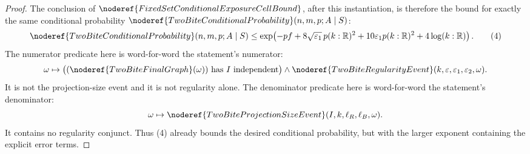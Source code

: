 \begin{proof}
The conclusion of \(\noderef{FixedSetConditionalExposureCellBound}\), after
this instantiation, is therefore the bound for exactly the same conditional
probability \(\noderef{TwoBiteConditionalProbability}(n,m,p;A\mid S)\):
\[
\noderef{TwoBiteConditionalProbability}(n,m,p;A\mid S)
\le
\exp\!\left(
-p f
+8\sqrt{\varepsilon_1}\,p(k:\mathbb R)^2
+10\varepsilon_1p(k:\mathbb R)^2
+4\log (k:\mathbb R)\right).
\tag{4}
\]
The numerator predicate here is word-for-word the statement's numerator:
\[
\omega\mapsto
\bigl((\noderef{TwoBiteFinalGraph}(\omega))\text{ has }I\text{ independent}\bigr)
\wedge
\noderef{TwoBiteRegularityEvent}(k,\varepsilon,\varepsilon_1,\varepsilon_2,
\omega).
\]
It is not the projection-size event and it is not regularity alone.  The
denominator predicate here is word-for-word the statement's denominator:
\[
\omega\mapsto
\noderef{TwoBiteProjectionSizeEvent}(I,k,\ell_R,\ell_B,\omega).
\]
It contains no regularity conjunct.  Thus (4) already bounds the desired
conditional probability, but with the larger exponent containing the explicit
error terms.


\end{proof}
